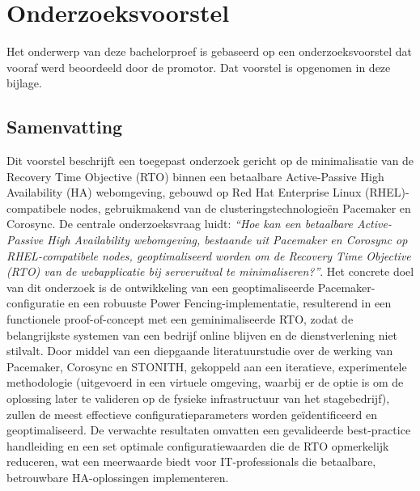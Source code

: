 \documentclass[dutch,dit,thesis]{hogentreport}
\begin{document}





%
%




\appendix

\chapter{Onderzoeksvoorstel}

Het onderwerp van deze bachelorproef is gebaseerd op een onderzoeksvoorstel dat vooraf werd beoordeeld door de promotor. Dat voorstel is opgenomen in deze bijlage.

\section*{Samenvatting}

Dit voorstel beschrijft een toegepast onderzoek gericht op de minimalisatie van de Recovery Time Objective (RTO) binnen een betaalbare Active-Passive High Availability (HA) webomgeving, gebouwd op Red Hat Enterprise Linux (RHEL)-compa\-tibele nodes, gebruikmakend van de clusteringstechnologieën Pacemaker en Corosync. De centrale onderzoeksvraag luidt: \textit{“Hoe kan een betaalbare Active-Passive High Availability webomgeving, bestaande uit Pacemaker en Corosync op RHEL-compatibele nodes, geoptimaliseerd worden om de Recovery Time Objective (RTO) van de webapplicatie bij serveruitval te minimaliseren?”}. Het concrete doel van dit onderzoek is de ontwikkeling van een geoptimaliseerde Pacemaker-configuratie en een robuuste Power Fencing-implementatie, resulterend in een functionele proof-of-concept met een geminimaliseerde RTO, zodat de belangrijkste systemen van een bedrijf online blijven en de dienstverlening niet stilvalt. Door middel van een diepgaande literatuurstudie over de werking van Pacemaker, Corosync en STONITH, gekoppeld aan een iteratieve, experimentele methodologie (uitgevoerd in een virtuele omgeving, waarbij er de optie is om de oplossing later te valideren op de fysieke infrastructuur van het stagebedrijf), zullen de meest effectieve configuratieparameters worden geïdentificeerd en geoptimaliseerd. De verwachte resultaten omvatten een gevalideerde best-practice handleiding en een set optimale configuratiewaarden die de RTO opmerkelijk reduceren, wat een meerwaarde biedt voor IT-professionals die betaalbare, betrouwbare HA-oplossingen implementeren.
\end{document}
